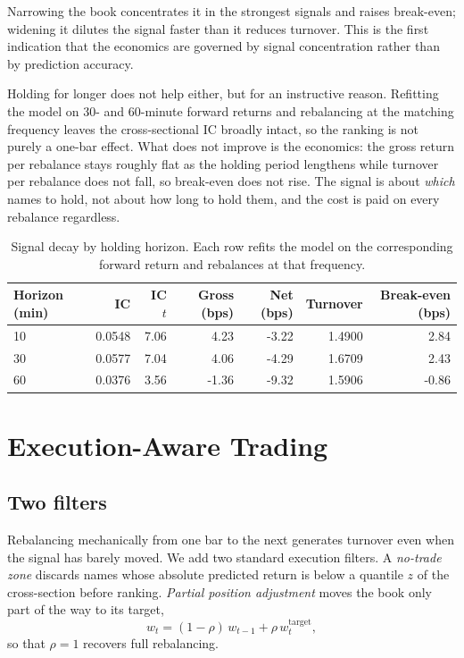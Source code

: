 \documentclass[11pt]{article}
\begin{document}
Narrowing the book concentrates it in the strongest signals and raises
break-even; widening it dilutes the signal faster than it reduces turnover.
This is the first indication that the economics are governed by signal
concentration rather than by prediction accuracy.

Holding for longer does not help either, but for an instructive reason.
Refitting the model on 30- and 60-minute forward returns and rebalancing at the
matching frequency leaves the cross-sectional IC broadly intact, so the ranking
is not purely a one-bar effect. What does not improve is the economics: the
gross return per rebalance stays roughly flat as the holding period lengthens
while turnover per rebalance does not fall, so break-even does not rise. The
signal is about \emph{which} names to hold, not about how long to hold them,
and the cost is paid on every rebalance regardless.

\begin{table}[!htbp]
\centering
\small
\caption{Signal decay by holding horizon. Each row refits the model on the
corresponding forward return and rebalances at that frequency.}
\label{tab:horizon}
\begin{tabular}{lrrrrrr}
\toprule
Horizon (min) & IC & IC $t$ & Gross (bps) & Net (bps) & Turnover & Break-even (bps) \\
\midrule
10 & 0.0548 & 7.06 & 4.23 & -3.22 & 1.4900 & 2.84 \\
30 & 0.0577 & 7.04 & 4.06 & -4.29 & 1.6709 & 2.43 \\
60 & 0.0376 & 3.56 & -1.36 & -9.32 & 1.5906 & -0.86 \\
\bottomrule
\end{tabular}
\end{table}

\FloatBarrier
\section{Execution-Aware Trading}

\subsection{Two filters}

Rebalancing mechanically from one bar to the next generates turnover even when
the signal has barely moved. We add two standard execution filters. A
\emph{no-trade zone} discards names whose absolute predicted return is below a
quantile $z$ of the cross-section before ranking. \emph{Partial position
adjustment} moves the book only part of the way to its target,
\[
w_t = (1-\rho)\, w_{t-1} + \rho\, w_t^{\text{target}} ,
\]
so that $\rho = 1$ recovers full rebalancing.
\end{document}

